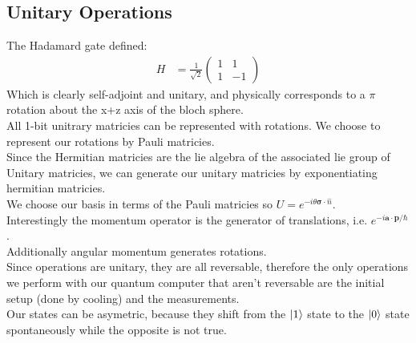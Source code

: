 \subsection{Unitary Operations}
The Hadamard gate defined:
\begin{align*}
	H &= \frac{1}{\sqrt{2}} \begin{pmatrix}
		1 & 1 \\
		1 & -1
			 \end{pmatrix}
\end{align*}
Which is clearly self-adjoint and unitary, and physically corresponds to a $\pi$ rotation about the x+z axis of the bloch sphere. \\
All 1-bit unitrary matricies can be represented with rotations. We choose to represent our rotations by Pauli matricies.\\
Since the Hermitian matricies are the lie algebra of the associated lie group of Unitary matricies, we can generate our unitary matricies by exponentiating hermitian matricies.\\
We choose our basis in terms of the Pauli matricies so $U = e^{-i\theta \bm{\sigma} \cdot \hat{n}}$. \\
Interestingly the momentum operator is the generator of translations, i.e. $e^{-i\bm{a}\cdot\bm{p}/\hbar}$. \\
Additionally angular momentum generates rotations. \\
Since operations are unitary, they are all reversable, therefore the only operations we perform with our quantum computer that aren't reversable are the initial setup (done by cooling) and the measurements. \\
Our states can be asymetric, because they shift from the $\ket{1}$ state to the $\ket{0}$ state spontaneously while the opposite is not true.
